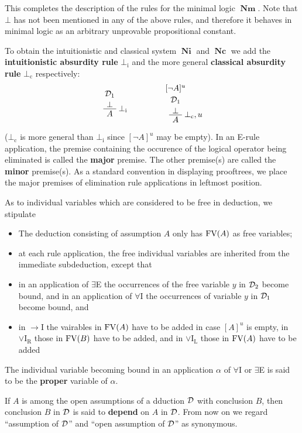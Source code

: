 \documentclass[11pt]{article}
\DeclareMathOperator{\Nm}{\textbf{Nm}}
\DeclareMathOperator{\Ni}{\textbf{Ni}}
\DeclareMathOperator{\Nc}{\textbf{Nc}}
\begin{document}
\begin{definition}[\textit{The systems} $\Nm,\Ni,\Nc$ ]
This completes the description of the rules for the minimal logic \(\Nm\). Note
that \(\bot\) has not been mentioned in any of the above rules, and therefore
it behaves in minimal logic as an arbitrary unprovable propositional
constant.

To obtain the intuitionistic and classical system \(\Ni\) and \(\Nc\) we add the 
\textbf{intuitionistic absurdity rule} \(\bot_\text{i}\) and the more general 
\textbf{classical absurdity rule} \(\bot_\text{c}\) respectively:
\begin{equation*}
\AxiomC{$\cald_1$}
\noLine
\UnaryInfC{$\bot$}\RightLabel{$\bot_\text{i}$}
\UnaryInfC{$A$}\DisplayProof\hspace{1.5cm}
\AxiomC{$[\neg A]^u$}\noLine\UnaryInfC{$\cald_1$}
\noLine\UnaryInfC{$\bot$}\RightLabel{$\bot_{\text{c}},u$}\UnaryInfC{$A$}
\DisplayProof
\end{equation*}

(\(\bot_{\text{c}}\) is more general than \(\bot_{\text{i}}\) since \([\neg A]^u\)
may be empty). In an E-rule application, the premise containing the occurence
of the logical operator being eliminated is called the \textbf{major} premise. The
other premise(s) are called the \textbf{minor} premise(s). As a standard convention in
displaying prooftrees, we place the major premises of elimination rule
applications in leftmost position.

As to individual variables which are considered to be free in deduction, we
stipulate
\begin{itemize}
\item The deduction consisting of assumption \(A\) only has \(\text{FV}(A)\) as free
variables;
\item at each rule application, the free individual variables are inherited from
the immediate subdeduction, except that
\item in an application of \(\exists\)E the occurrences of the free variable
\(y\) in \(\mathcal{D}_2\) become bound, and in an application of \(\forall\)I the
occurrences of variable \(y\) in \(\mathcal{D}_1\) become bound, and
\item in \(\to\)I the vairables in \(\text{FV}(A)\) have to be added in case \([A]^u\) is
empty, in \(\vee\text{I}_\text{R}\) those in \(\text{FV}(B)\) have to be added, and
in \(\vee\text{I}_\text{L}\) those in \(\text{FV}(A)\) have to be added
\end{itemize}


The individual variable becoming bound in an application \(\alpha\) of
\(\forall\)I or \(\exists\)E is said to be the \textbf{proper} variable of \(\alpha\). 


If \(A\) is among the open assumptions of a dduction \(\mathcal{D}\) with conclusion
\(B\), then conclusion \(B\) in \(\mathcal{D}\) is said to \textbf{depend} on \(A\) in \(\mathcal{D}\). From
now on we regard ``assumption of \(\mathcal{D}\)'' and ``open assumption of \(\mathcal{D}\)'' as
synonymous. 
\end{definition}
\end{document}
